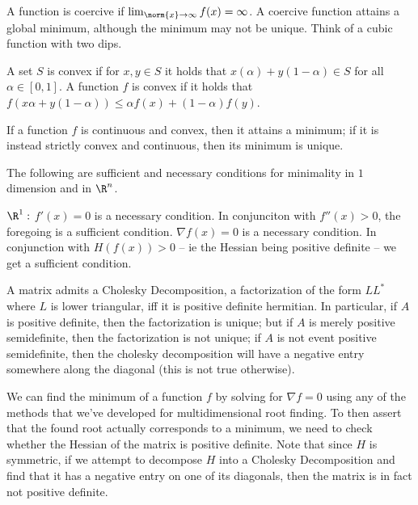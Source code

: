 \documentclass[../main.tex]{subfiles}
\begin{document}
\begin{definition}
    A function is coercive if $\lim_{\norm{x} \to \infty} f(x) = \infty$. A coercive function attains a global minimum, although the minimum may not be unique. Think of a cubic function with two dips.
\end{definition}


\begin{definition}
    A set $S$ is convex if for $x,y \in S$ it holds that $x(\alpha) + y(1 - \alpha) \in S$ for all $\alpha \in [0,1]$. A function $f$ is convex if it holds that $f(x \alpha + y (1 - \alpha)) \leq \alpha f(x) + (1 - \alpha)f(y)$. 
\end{definition}

\begin{proposition}
    If a function $f$ is continuous and convex, then it attains a minimum; if it is instead strictly convex and continuous, then its minimum is unique.
\end{proposition}

\begin{lemma}
    The following are sufficient and necessary conditions for minimality in $1$ dimension and in $\R^n$.
    \begin{outline}
    \1 $\R^1:$ 
    \2 $f'(x) = 0$ is a necessary condition.
    \2 In conjunciton with $f''(x) > 0$, the foregoing is a sufficient condition.
    \2 $\nabla f(x) = 0$ is a necessary condition.
    \2 In conjunction with $H(f(x)) > 0$ -- ie the Hessian being positive definite -- we get a sufficient condition.
    \end{outline}
\end{lemma}

\begin{definition}
    A  matrix admits a Cholesky Decomposition, a factorization of the form $LL^{*}$ where $L$ is lower triangular, iff it is positive definite hermitian. In particular, if $A$ is positive definite, then the factorization is unique; but if $A$ is merely positive semidefinite, then the factorization is not unique; if $A$ is not event positive semidefinite, then the cholesky decomposition will have a negative entry somewhere along the diagonal (this is not true otherwise).
\end{definition}

\begin{remark}
    We can find the minimum of a function $f$ by solving for $\nabla f = 0$ using any of the methods that we've developed for multidimensional root finding. To then assert that the found root actually corresponds to a minimum, we need to check whether the Hessian of the matrix is positive definite. Note that since $H$ is symmetric, if we attempt to decompose $H$ into a Cholesky Decomposition and find that it has a negative entry on one of its diagonals, then the matrix is in fact not positive definite. 
\end{remark}
\end{document}
